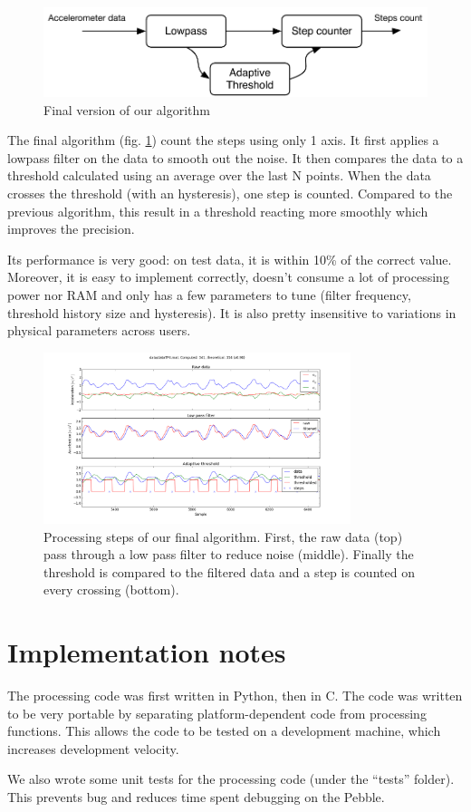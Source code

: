 \documentclass[12pt,twoside,a4paper]{article}
\begin{document}
\begin{figure}[h]
    \centering
    \includegraphics{algorithm}
    \caption{Final version of our algorithm}
    \label{fig:algorithm}
\end{figure}

The final algorithm (fig. \ref{fig:algorithm}) count the steps using only 1 axis.
It first applies a lowpass filter on the data to smooth out the noise.
It then compares the data to a threshold calculated using an average over the last N points.
When the data crosses the threshold (with an hysteresis), one step is counted.
Compared to the previous algorithm, this result in a threshold reacting more smoothly which improves the precision.

Its performance is very good: on test data, it is within 10\% of the correct value.
Moreover, it is easy to implement correctly, doesn't consume a lot of processing power nor RAM and only has a few parameters to tune (filter frequency, threshold history size and hysteresis).
It is also pretty insensitive to variations in physical parameters across users.

\begin{figure}[h]
    \centering
    \includegraphics[width=0.8\textwidth]{algorithm_steps}
    \caption{Processing steps of our final algorithm.
        First, the raw data (top) pass through a low pass filter to reduce noise (middle).
        Finally the threshold is compared to the filtered data and a step is counted on every crossing (bottom).
    }
    \label{fig:steps}
\end{figure}

\section{Implementation notes}
The processing code was first written in Python, then in C.
The code was written to be very portable by separating platform-dependent code from processing functions.
This allows the code to be tested on a development machine, which increases development velocity.

We also wrote some unit tests for the processing code (under the ``tests'' folder).
This prevents bug and reduces time spent debugging on the Pebble.
\end{document}
